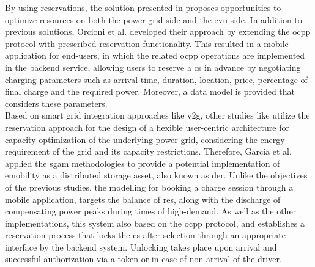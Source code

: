 By using reservations, the solution presented in \cite{orcioni_electric_2018} proposes opportunities to optimize resources on both the power grid side and the \acrshort{evu} side.
In addition to previous solutions, Orcioni et al. developed their approach by extending the \acrshort{ocpp} protocol with prescribed reservation functionality.
This resulted in a mobile application for end-users, in which the related \acrshort{ocpp} operations are implemented in the backend service, allowing users to reserve a \acrshort{cs} in advance by negotiating charging parameters such as arrival time, duration, location, price, percentage of final charge and the required power.
Moreover, a data model is provided that considers these parameters. \\
\noindent Based on smart grid integration approaches like \acrshort{v2g}, other studies like \cite{garcia_sgam-based_2023} utilize the reservation approach for the design of a flexible user-centric architecture for capacity optimization of the underlying power grid, considering the energy requirement of the grid and its capacity restrictions.
Therefore, Garcia et al. applied the \acrshort{sgam} \cite{noauthor_sgam_nodate} methodologies to provide a potential implementation of \acrshort{emobility} as a distributed storage asset, also known as \acrshort{der}.
Unlike the objectives of the previous studies, the modelling for booking a charge session through a mobile application, targets the balance of \acrshort{res}, along with the discharge of  compensating power peaks during times of high-demand. 
As well as the other implementations, this system also based on the \acrshort{ocpp} protocol, and establishes a reservation process that locks the \acrshort{cs} after selection through an appropriate interface by the backend system. Unlocking takes place upon arrival and successful authorization via a token or in case of non-arrival of the driver. \\
